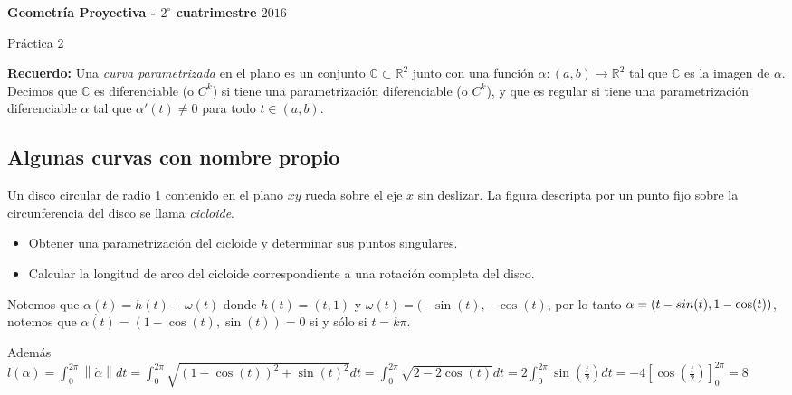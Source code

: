 \documentclass[11pt]{article}
\newcommand{\C}{\mathbb{C}}
\newcommand{\R}{{\mathbb{R}}}
\newcommand\norm[1]{\left\lVert#1\right\rVert}
\newenvironment{proof}[1][Demostraci\'on]{\begin{trivlist}
		\item[\hskip \labelsep {\bfseries #1}]}{\end{trivlist}}
\newcommand{\qed}{\nobreak \ifvmode \relax \else
	\ifdim\lastskip<1.5em \hskip-\lastskip
	\hskip1.5em plus0em minus0.5em \fi \nobreak
	\vrule height0.75em width0.5em depth0.25em\fi}
\begin{document}
	
	\pagestyle{empty}
	\pagestyle{fancy}
	\fancyfoot[CO]{\slshape \thepage}
	\renewcommand{\headrulewidth}{0pt}
	
	
	
	\centerline{\bf Geometr\'ia Proyectiva - $2^{\circ}$ cuatrimestre $2016$}
	\centerline{\sc Pr\'actica 2}
	
	\bigskip
	
\textbf{Recuerdo:} Una \emph{curva parametrizada} en el plano es un conjunto $\C \subset
\R^2$ junto con una funci\'on $\alpha: (a,b) \to \R^2$ tal que $\C$ es la imagen de
$\alpha$. Decimos que $\C$ es diferenciable (o $C^k$) si tiene una parametrizaci\'on
diferenciable (o $C^k$), y que es regular si tiene una parametrizaci\'on diferenciable
$\alpha$ tal que $\alpha'(t) \neq 0$ para todo $t \in (a,b)$.
\begin{enumerate}
	
	\section{Algunas curvas con nombre propio}
	
	\item Un disco circular de radio 1 contenido en el plano $xy$ rueda sobre el eje $x$ sin
	deslizar. La figura descripta por un punto fijo sobre la circunferencia del disco se
	llama \emph{cicloide}.
	
	\begin{itemize}
		\item Obtener una parametrizaci\'on del cicloide y determinar sus puntos singulares.
		
		\item Calcular la longitud de arco del cicloide correspondiente a una rotaci\'on completa del
		disco.
	\end{itemize}
	
	\label{Eercicio 1}
	
	\begin{proof}
		
		Notemos que $\alpha(t) = h(t) + \omega(t)$ donde $h(t) = (t,1)$ y $\omega(t) = (-\sin(t) , -\cos(t)$, por lo tanto $\alpha = (t - \\sin(t) , 1 - \cos(t))$, notemos que $\dot{\alpha(t)} = (1- \cos(t) , \sin(t)) = 0$ si y s\'olo si $t = k\pi$.
		
		Adem\'as $l(\alpha) = \int_{0}^{2\pi}{\norm{\dot{\alpha}} dt} = \int_{0}^{2\pi}{\sqrt{(1- \cos(t))^2 + \sin(t)^2}dt} = \int_{0}^{2\pi}{\sqrt{2- 2 \cos(t)}dt} = 2\int_{0}^{2\pi}{\sin(\frac{t}{2})dt} = -4 [\cos(\frac{t}{2})]^{2\pi}_{0} = 8$ \qed
		

\end{proof}
\end{enumerate}
\end{document}
